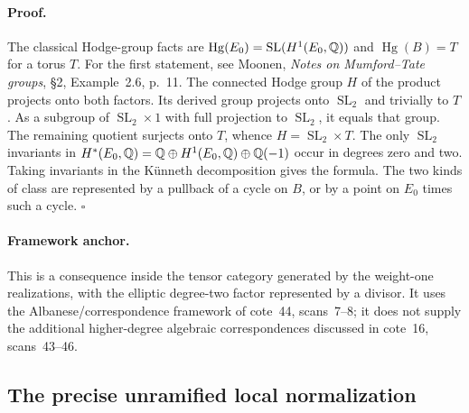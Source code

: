 \paragraph{Proof.}
The classical Hodge-group facts are
$\operatorname{Hg}(E_0)=\operatorname{SL}(H^1(E_0,\mathbb Q))$ and
$\operatorname{Hg}(B)=T$ for a torus $T$. For the first statement,
see Moonen, \emph{Notes on Mumford--Tate groups}, \S2,
Example~2.6, p.~11. The connected Hodge group $H$ of the product
projects onto both factors. Its derived group projects onto
$\operatorname{SL}_2$ and trivially to $T$. As a subgroup of
$\operatorname{SL}_2\times1$ with full projection to
$\operatorname{SL}_2$, it equals that group. The remaining quotient
surjects onto $T$, whence $H=\operatorname{SL}_2\times T$.
The only $\operatorname{SL}_2$ invariants in
$H^*(E_0,\mathbb Q)=\mathbb Q\oplus H^1(E_0,\mathbb Q)\oplus\mathbb Q(-1)$ occur in degrees
zero and two. Taking invariants in the K\"unneth decomposition gives
the formula. The two kinds of class are represented by a pullback of
a cycle on $B$, or by a point on $E_0$ times such a cycle. $\square$

\paragraph{Framework anchor.}
This is a consequence inside the tensor category generated by the
weight-one realizations, with the elliptic degree-two factor represented
by a divisor.  It uses the Albanese/correspondence framework of cote~44,
scans~7--8; it does not supply the additional higher-degree algebraic
correspondences discussed in cote~16, scans~43--46.

\subsection{The precise unramified local normalization}

